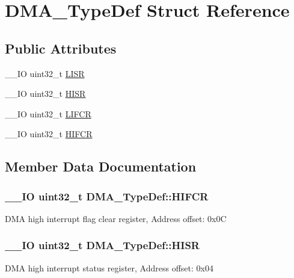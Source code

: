 \hypertarget{struct_d_m_a___type_def}{}\section{D\+M\+A\+\_\+\+Type\+Def Struct Reference}
\label{struct_d_m_a___type_def}
\subsection*{Public Attributes}
\begin{DoxyCompactItemize}
\item 
\+\_\+\+\_\+\+I\+O uint32\+\_\+t \hyperlink{struct_d_m_a___type_def_aacb4a0977d281bc809cb5974e178bc2b}{L\+I\+S\+R}
\item 
\+\_\+\+\_\+\+I\+O uint32\+\_\+t \hyperlink{struct_d_m_a___type_def_a01a90a5fcd6459e10b81c0ab737dd2e3}{H\+I\+S\+R}
\item 
\+\_\+\+\_\+\+I\+O uint32\+\_\+t \hyperlink{struct_d_m_a___type_def_a11adb689c874d38b49fa44990323b653}{L\+I\+F\+C\+R}
\item 
\+\_\+\+\_\+\+I\+O uint32\+\_\+t \hyperlink{struct_d_m_a___type_def_a1e4f50b935bab2520788ae936f2e55c1}{H\+I\+F\+C\+R}
\end{DoxyCompactItemize}


\subsection{Member Data Documentation}
\hypertarget{struct_d_m_a___type_def_a1e4f50b935bab2520788ae936f2e55c1}{}
\subsubsection[{H\+I\+F\+C\+R}]{\setlength{\rightskip}{0pt plus 5cm}\+\_\+\+\_\+\+I\+O uint32\+\_\+t D\+M\+A\+\_\+\+Type\+Def\+::\+H\+I\+F\+C\+R}\label{struct_d_m_a___type_def_a1e4f50b935bab2520788ae936f2e55c1}
D\+M\+A high interrupt flag clear register, Address offset\+: 0x0\+C \hypertarget{struct_d_m_a___type_def_a01a90a5fcd6459e10b81c0ab737dd2e3}{}
\subsubsection[{H\+I\+S\+R}]{\setlength{\rightskip}{0pt plus 5cm}\+\_\+\+\_\+\+I\+O uint32\+\_\+t D\+M\+A\+\_\+\+Type\+Def\+::\+H\+I\+S\+R}\label{struct_d_m_a___type_def_a01a90a5fcd6459e10b81c0ab737dd2e3}
D\+M\+A high interrupt status register, Address offset\+: 0x04 \hypertarget{struct_d_m_a___type_def_a11adb689c874d38b49fa44990323b653}{}
